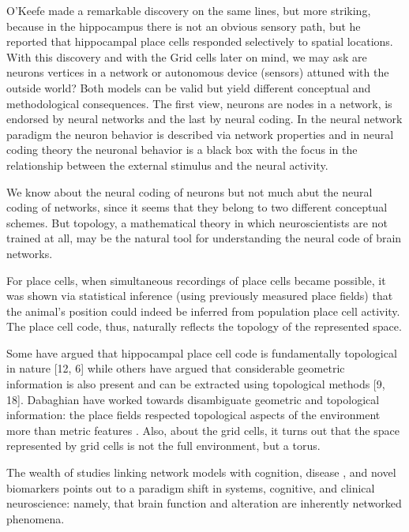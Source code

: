 \documentclass[onecollarge,runningheads]{svjour2}
\begin{document}
O'Keefe made a remarkable discovery on the same lines, but more striking, because in the hippocampus there is not an obvious sensory path, but he reported that hippocampal place cells responded selectively to spatial locations.
With this discovery and with the Grid cells later on mind, we may ask are neurons vertices in a network or autonomous device (sensors) attuned with the outside world? Both models can be valid but yield different conceptual and methodological consequences. The first view, neurons are nodes in a network, is endorsed by neural networks and the last by neural coding. In the neural network paradigm the neuron behavior is described via network properties and in neural coding theory the neuronal behavior is a black box with the focus in the relationship between the external stimulus and the neural activity.

We know about the neural coding of neurons but not much abut the neural coding of networks, since it seems that they belong to two different conceptual schemes. But topology, a mathematical theory in which neuroscientists are not trained at all, may be the natural tool for understanding the neural code of brain networks.

For place cells, when simultaneous recordings of place cells became possible, it was shown via statistical inference (using previously measured place fields) that the animal's position could indeed be inferred from population place cell activity. The place cell code, thus, naturally reflects the topology of the represented space.

\cite{curto2016can} Some have argued that hippocampal place cell code is fundamentally topological in nature [12, 6] while others have argued that considerable geometric information is also present and can be extracted using topological methods [9, 18]. Dabaghian have worked towards disambiguate geometric and topological information: the place fields respected topological aspects of the environment more than metric features \cite{dabaghian2014reconceiving}. Also, about the grid cells, it turns out that the space represented by grid cells is not the full environment, but a torus.

The wealth of studies linking network models with cognition, disease \cite{stefan2013epileptic}, \cite{stam2014modern} and novel biomarkers points out to a paradigm shift in systems, cognitive, and clinical neuroscience: namely, that brain function and alteration are inherently networked phenomena.
\end{document}
